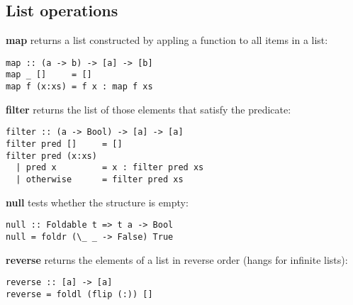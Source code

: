 %

\subsection{List operations}

\textbf{map} returns a list constructed by appling a function to all items in a list:
\begin{verbatim}
map :: (a -> b) -> [a] -> [b]
map _ []     = []
map f (x:xs) = f x : map f xs
\end{verbatim}

\textbf{filter} returns the list of those elements that satisfy the predicate:
\begin{verbatim}
filter :: (a -> Bool) -> [a] -> [a]
filter pred []     = []
filter pred (x:xs)
  | pred x         = x : filter pred xs
  | otherwise      = filter pred xs
\end{verbatim}







\textbf{null} tests whether the structure is empty:
\begin{verbatim}
null :: Foldable t => t a -> Bool
null = foldr (\_ _ -> False) True
\end{verbatim}


\textbf{reverse} returns the elements of a list in reverse order (hangs for infinite lists):
\begin{verbatim}
reverse :: [a] -> [a]
reverse = foldl (flip (:)) []
\end{verbatim}



































%